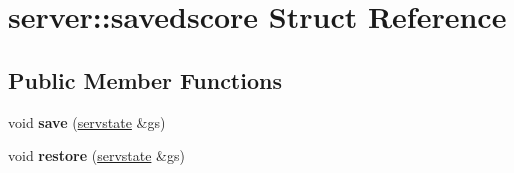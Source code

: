 \hypertarget{structserver_1_1savedscore}{}\section{server\+:\+:savedscore Struct Reference}
\label{structserver_1_1savedscore}
\subsection*{Public Member Functions}
\begin{DoxyCompactItemize}
\item 
\mbox{\label{structserver_1_1savedscore_ad85adff21ac48b7344c96e2affaee9c1}} 
void {\bfseries save} (\hyperlink{structserver_1_1servstate}{servstate} \&gs)
\item 
\mbox{\label{structserver_1_1savedscore_a78c417d11de4f2823230fe2c10d0de73}} 
void {\bfseries restore} (\hyperlink{structserver_1_1servstate}{servstate} \&gs)
\end{DoxyCompactItemize}
